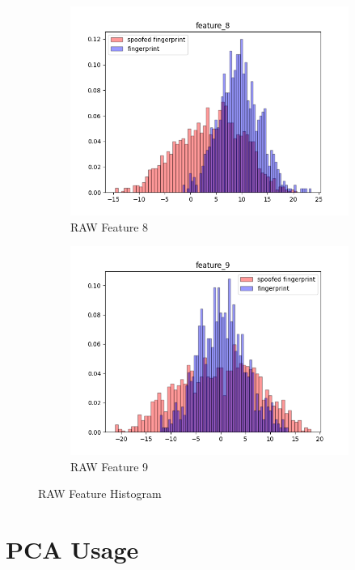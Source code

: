 \documentclass[english]{report}
\begin{document}
\begin{figure}[h!]
\begin{subfigure}{0.3\textwidth}
        \includegraphics[scale=0.3]{../../images/feature_plot/hist_feature_8}
        \caption{RAW Feature 8}
    \end{subfigure}
    \begin{subfigure}{0.3\textwidth}
        \includegraphics[scale=0.3]{../../images/feature_plot/hist_feature_9}
        \caption{RAW Feature 9}
    \end{subfigure}
    \centering
    \caption{RAW Feature Histogram}
    \label{fig:RawFeatureHistogram}
\end{figure}


\section{PCA Usage}
\end{document}
